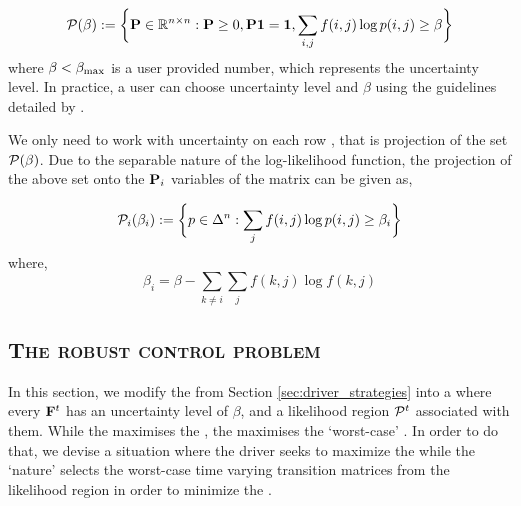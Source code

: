 \begin{equation}
\mathcal{P}(\beta) := \bigg\{{\mathbf{P}} \in \mathbb{R}^{n \times n}: {\mathbf{P}} \geq 0, {\mathbf{P}} \mathbf{1}=\mathbf{1}, \sum_{i,j}f(i,j)\log{p(i,j)} \geq \beta\bigg\} \label{eq:likelihood_region}
\end{equation}
where $\beta < \beta_{\textrm{max}}$ is a user provided number, which represents the uncertainty level. In practice, a user can choose uncertainty level and $\beta$ using the guidelines detailed by \citet{nilim2004robustness}.

We only need to work with uncertainty on each row {\truetransitionmatrix}, that is projection of the set $\mathcal{P}(\beta)$. Due to the separable nature of the log-likelihood function, the projection of the above set onto the ${\mathbf{P}}_i$ variables of the matrix {\truetransitionmatrix} can be given as,

\begin{equation}
\mathcal{P}_i(\beta_i) := \bigg\{p \in \Delta^n : \sum_{j}f(i,j)\log{p(i,j)} \geq \beta_i \bigg\}
\end{equation}
where,
\begin{equation}
\beta_i = \beta - \sum_{k \neq i}\sum_{j}f(k,j)\log{f(k,j)}
\end{equation}

\subsection{\textsc{The robust control problem}}

In this section, we modify the {\nominalproblem} from Section \ref{sec:driver_strategies} into a {\robustcontrolproblem} where every ${{\mathbf{F}}}^t$ has an uncertainty level of $\beta$, and a likelihood region $\mathcal{P}^t$ associated with them. While the {\nominalproblem} maximises the {\totalexpectedearnings}, the {\nominalproblem} maximises the `worst-case' {\totalexpectedearnings}. In order to do that, we devise a situation where the driver seeks to maximize the {\totalexpectedearnings} while the `nature' selects the worst-case time varying transition matrices from the likelihood region {\likelihoodregion} in order to minimize the {\totalexpectedearnings}.

